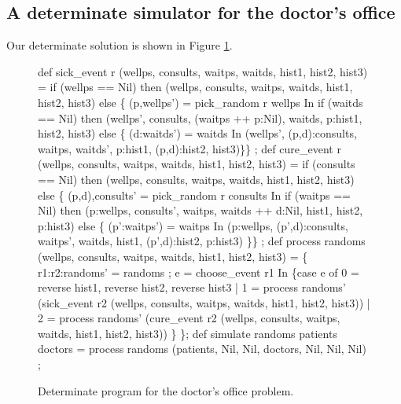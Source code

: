 \subsection{A determinate simulator for the doctor's office}

Our determinate solution is shown in Figure \ref{doctor-det-program}.

\begin{figure}[htbp]
 \hdivider
\begin{idenv}
def sick\_event r (wellps, consults, waitps, waitds, hist1, hist2, hist3) =
    if (wellps == Nil) then
      (wellps, consults, waitps, waitds, hist1, hist2, hist3)
    else
      \{ (p,wellps') = pick\_random r wellps
      In
        if (waitds == Nil) then
          (wellps', consults, (waitps ++ p:Nil), waitds, p:hist1, hist2, hist3)
        else
          \{ (d:waitds') = waitds
          In
            (wellps', (p,d):consults, waitps, waitds',
             p:hist1, (p,d):hist2, hist3)\}\} ;
\null
def cure\_event r (wellps, consults, waitps, waitds, hist1, hist2, hist3) =
    if (consults == Nil) then
       (wellps, consults, waitps, waitds, hist1, hist2, hist3)
    else
       \{ (p,d),consults' = pick\_random r consults
       In
         if (waitps == Nil) then
           (p:wellps, consults', waitps, waitds ++ d:Nil, hist1, hist2, p:hist3)
         else
           \{ (p':waitps') = waitps
           In
             (p:wellps, (p',d):consults, waitps', waitds,
              hist1, (p',d):hist2, p:hist3) \}\} ;
\null
def process randoms (wellps, consults, waitps, waitds, hist1, hist2, hist3) =
    \{  r1:r2:randoms' = randoms ;
       e = choose\_event r1
    In
       \{case e of
          0 = reverse hist1, reverse hist2, reverse hist3
       |  1 = process randoms'
                      (sick\_event r2
                                   (wellps, consults, waitps, waitds,
                                    hist1, hist2, hist3))
       |  2 = process randoms'
                      (cure\_event r2
                                   (wellps, consults, waitps, waitds,
                                    hist1, hist2, hist3)) \} \};
\null
def simulate randoms patients doctors =
    process randoms
            (patients, Nil, Nil, doctors, Nil, Nil, Nil) ;
\end{idenv}
 \caption{%
    \label{doctor-det-program}
    Determinate program for the doctor's office problem.
         }
 \hdivider
\end{figure}


